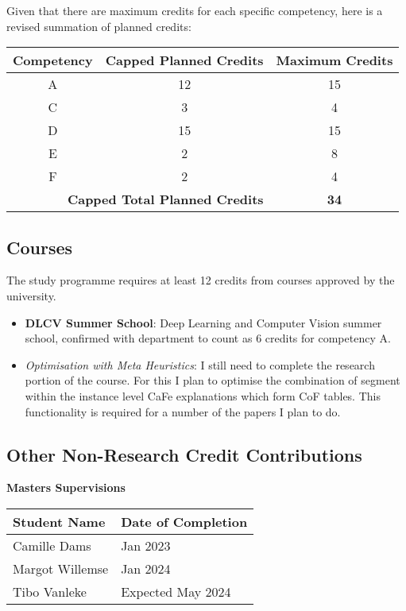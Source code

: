 Given that there are maximum credits for each specific competency, here is a revised summation of planned credits:

\begin{tabular}{|c|c|c|}
    \hline
    \textbf{Competency} & \textbf{Capped Planned Credits} & \textbf{Maximum Credits} \\ \hline
    A                   & 12                              & 15                       \\ \hline
    C                   & 3                               & 4                        \\ \hline
    D                   & 15                              & 15                       \\ \hline
    E                   & 2                               & 8                        \\ \hline
    F                   & 2                               & 4                        \\ \hline
    \multicolumn{2}{|r|}{\textbf{Capped Total Planned Credits}} & \textbf{34}      \\ \hline
\end{tabular}

\subsection*{Courses}

The study programme requires at least 12 credits from courses approved by the university.
\begin{itemize}
    \item \textbf{DLCV Summer School}:
     Deep Learning and Computer Vision summer school, confirmed with department
    to count as 6 credits for competency A.
    \item \textit{Optimisation with Meta Heuristics}:
    I still need to complete the research portion of the course.
    For this I plan to optimise the combination of segment within the instance level CaFe explanations which form 
    CoF tables.
    This functionality is required for a number of the papers I plan to do.
\end{itemize}

\subsection*{Other Non-Research Credit Contributions}

\textbf{Masters Supervisions}
    \begin{table}[h]
    \begin{tabular}{|l|l|}
        \hline
        \textbf{Student Name} & \textbf{Date of Completion} \\ \hline
        Camille Dams & Jan 2023 \\ \hline
        Margot Willemse & Jan 2024 \\ \hline
        Tibo Vanleke & Expected May 2024\\ \hline
    \end{tabular}
\end{table}

